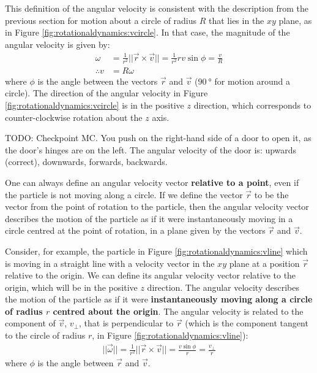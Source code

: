This definition of the angular velocity is consistent with the description from the previous section for motion about a circle of radius $R$ that lies in the $xy$ plane, as in Figure \ref{fig:rotationaldynamics:vcircle}. In that case, the magnitude of the angular velocity is given by:
\begin{align*}
\omega &=\frac{1}{r^2} || \vec r \times \vec v||= \frac{1}{r^2}r v\sin\phi= \frac{v}{R}\\
\therefore v &= R\omega
\end{align*}
where $\phi$ is the angle between the vectors $\vec r$ and $\vec v$ ($\SI{90}{\degree}$ for motion around a circle). The direction of the angular velocity in Figure \ref{fig:rotationaldynamics:vcircle} is in the positive $z$ direction, which corresponds to counter-clockwise rotation about the $z$ axis. 

TODO: Checkpoint MC. You push on the right-hand side of a door to open it, as the door's hinges are on the left. The angular velocity of the door is: upwards (correct), downwards, forwards, backwards.

One can always define an angular velocity vector \textbf{relative to a point}, even if the particle is not moving along a circle. If we define the vector $\vec r$ to be the vector from the point of rotation to the particle, then the angular velocity vector describes the motion of the particle as if it were instantaneously moving in a circle centred at the point of rotation, in a plane given by the vectors $\vec r$ and $\vec v$. 

Consider, for example, the particle in Figure \ref{fig:rotationaldynamics:vline} which is moving in a straight line with a velocity vector in the $xy$ plane at a position $\vec r$ relative to the origin. We can define its angular velocity vector relative to the origin, which will be in the positive $z$ direction. 
The angular velocity describes the motion of the particle as if it were \textbf{instantaneously moving along a circle of radius $r$ centred about the origin}. The angular velocity is related to the component of $\vec v$, $v_\perp$, that is perpendicular to $\vec r$ (which is the component tangent to the circle of radius $r$, in Figure \ref{fig:rotationaldynamics:vline}):
\begin{align}
||\vec \omega|| = \frac{1}{r^2} || \vec r \times \vec v||=\frac{v\sin\phi}{r}= \frac{v_\perp}{r}
\end{align}
where $\phi$ is the angle between $\vec r$ and $\vec v$.

